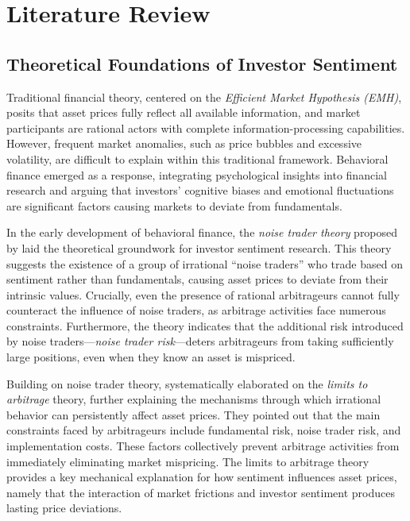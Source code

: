 \documentclass[AER]{AEA}
\begin{document}
\section{Literature Review}

\subsection{Theoretical Foundations of Investor Sentiment}

Traditional financial theory, centered on the \textit{Efficient Market Hypothesis (EMH)}, posits that asset prices fully reflect all available information, and market participants are rational actors with complete information-processing capabilities. However, frequent market anomalies, such as price bubbles and excessive volatility, are difficult to explain within this traditional framework. Behavioral finance emerged as a response, integrating psychological insights into financial research and arguing that investors' cognitive biases and emotional fluctuations are significant factors causing markets to deviate from fundamentals.

In the early development of behavioral finance, the \textit{noise trader theory} proposed by \citet{de1990noise} laid the theoretical groundwork for investor sentiment research. This theory suggests the existence of a group of irrational ``noise traders'' who trade based on sentiment rather than fundamentals, causing asset prices to deviate from their intrinsic values. Crucially, even the presence of rational arbitrageurs cannot fully counteract the influence of noise traders, as arbitrage activities face numerous constraints. Furthermore, the theory indicates that the additional risk introduced by noise traders---\textit{noise trader risk}---deters arbitrageurs from taking sufficiently large positions, even when they know an asset is mispriced.

Building on noise trader theory, \citet{shleifer1997limits} systematically elaborated on the \textit{limits to arbitrage} theory, further explaining the mechanisms through which irrational behavior can persistently affect asset prices. They pointed out that the main constraints faced by arbitrageurs include fundamental risk, noise trader risk, and implementation costs. These factors collectively prevent arbitrage activities from immediately eliminating market mispricing. The limits to arbitrage theory provides a key mechanical explanation for how sentiment influences asset prices, namely that the interaction of market frictions and investor sentiment produces lasting price deviations.
\end{document}

